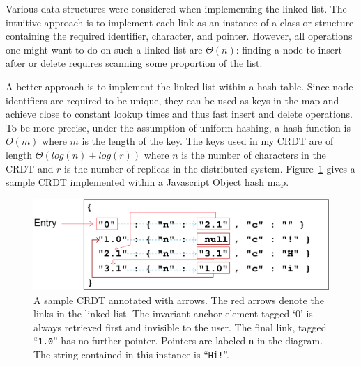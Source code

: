 \documentclass[12pt,a4paper,twoside,openright]{report}
\begin{document}
		Various data structures were considered when implementing the linked list. The intuitive approach is to implement each link as an instance of a class or structure containing the required identifier, character, and pointer. However, all operations one might want to do on such a linked list are $\Theta (n)$: finding a node to insert after or delete requires scanning some proportion of the list.
		
		A better approach is to implement the linked list within a hash table. Since node identifiers are required to be unique, they can be used as keys in the map and achieve close to constant lookup times and thus fast insert and delete operations. To be more precise, under the assumption of uniform hashing, a hash function is $O(m)$ where $m$ is the length of the key. The keys used in my CRDT are of length $\Theta (log(n)+log(r))$ where $n$ is the number of characters in the CRDT and $r$ is the number of replicas in the distributed system. Figure~\ref{fig:hashlist} gives a sample CRDT implemented within a Javascript Object hash map.
		
		
		




	\begin{figure}[H]
		\centering
		\includegraphics[width=1\linewidth]{figs/json_annotated.eps}
		\caption[Annotated CRDT]{A sample CRDT annotated with arrows. The red arrows denote the links in the linked list. The invariant anchor element tagged `0' is always retrieved first and invisible to the user. The final link, tagged ``\texttt{1.0}'' has no further pointer. Pointers are labeled \texttt{n} in the diagram. The string contained in this instance is ``\texttt{Hi!}''.}
		\label{fig:hashlist}
		\end{figure}
		
\end{document}
